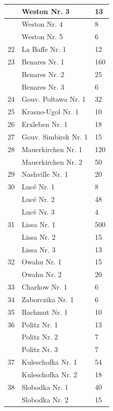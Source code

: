 \documentclass[a4paper, 11pt, oneside, polutonikogreek, german]{article}
\begin{document}
\begin{center}
\begin{longtable}{|l|l|l|}
          & Weston Nr. 3 & 13 \\ \hline
          & Weston Nr. 4 & 8 \\ \hline
          & Weston Nr. 5 & 6 \\ \hline
        22 & La Baffe Nr. 1 & 12 \\ \hline
        23 & Benares Nr. 1 & 160 \\ \hline
          & Benares Nr. 2 & 25 \\ \hline
          & Benares Nr. 3 & 6 \\ \hline
        24 & Gouv. Poltawa Nr. 1 & 32 \\ \hline
        25 & Krasno-Ugol Nr. 1 & 10 \\ \hline
        26 & Erxleben Nr. 1 & 18 \\ \hline
        27 & Gouv. Simbirsk Nr. 1 & 15 \\ \hline
        28 & Mauerkirchen Nr. 1 & 120 \\ \hline
          & Mauerkirchen Nr. 2 & 50 \\ \hline
        29 & Nashville Nr. 1 & 20 \\ \hline
        30 & Lucé Nr. 1 & 8 \\ \hline
          & Lucé Nr. 2 & 48 \\ \hline
          & Lucé Nr. 3 & 4 \\ \hline
        31 & Lissa Nr. 1 & 500 \\ \hline
          & Lissa Nr. 2 & 15 \\ \hline
          & Lissa Nr. 3 & 13 \\ \hline
        32 & Owahu Nr. 1 & 15 \\ \hline
          & Owahu Nr. 2 & 20 \\ \hline
        33 & Charkow Nr. 1 & 6 \\ \hline
        34 & Zaborczika Nr. 1 & 6 \\ \hline
        35 & Bachmut Nr. 1 & 10 \\ \hline
        36 & Politz Nr. 1 & 13 \\ \hline
          & Politz Nr. 2 & 7 \\ \hline
          & Politz Nr. 3 & 7 \\ \hline
        37 & Kuleschofka Nr. 1 & 54 \\ \hline
          & Kuleschofka Nr. 2 & 18 \\ \hline
        38 & Slobodka Nr. 1 & 40 \\ \hline
          & Slobodka Nr. 2 & 15 \\ \hline

\end{longtable}
\end{center}
\end{document}
